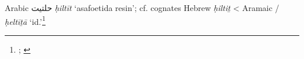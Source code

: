 \begin{etymology}\label{ety:hiltit}
Arabic {حلتيت} \textit{ḥiltīt} `asafoetida resin'; cf. cognates Hebrew  \textit{ḥiltiṯ}
< Aramaic {/} \textit{ḥeltīṯā} `id.'\footnote{\textcite[140]{fraenkel_aramaischen_1886}; \textcites[36]{low_aramaeische_1881}[vol. 3, p. 452-455]{low_flora_1924}}
\end{etymology}